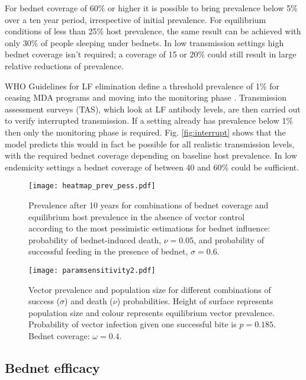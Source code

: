 \documentclass[5p,times]{elsarticle}
\begin{document}
For bednet coverage of 60\% or higher it is possible to bring prevalence below 5\% over a ten year period, irrespective of initial prevalence. For equilibrium conditions of less than 25\% host prevalence, the same result can be achieved with only 30\% of people sleeping under bednets. In low transmission settings high bednet coverage isn't required; a coverage of 15 or 20\% could still result in large relative reductions of prevalence.

WHO Guidelines for LF elimination define a threshold prevalence of 1\% for ceasing MDA programs and moving into the monitoring phase \cite{GPELF}. Transmission assessment surveys (TAS), which look at LF antibody levels, are then carried out to verify interrupted transmission. If a setting already has prevalence below 1\% then only the monitoring phase is required. Fig. \ref{fig:interrupt} shows that the model predicts this would in fact be possible for all realistic transmission levels, with the required bednet coverage depending on baseline host prevalence. In low endemicity settings a bednet coverage of between 40 and 60\% could be sufficient.
\begin{figure}[h]
\begin{center}
\texttt{[image: heatmap\_prev\_pess.pdf]}
\caption{Prevalence after 10 years for combinations of bednet coverage and equilibrium host prevalence in the absence of vector control according to the most pessimistic estimations for bednet influence: probability of bednet-induced death, $\nu=0.05$, and probability of successful feeding in the presence of bednet, $\sigma=0.6$.}
\label{fig:inter_pess}
\end{center}
\end{figure}
\begin{figure}[h]
\begin{center}
\texttt{[image: paramsensitivity2.pdf]}
\caption{Vector prevalence and population size for different combinations of success ($\sigma$) and death ($\nu$) probabilities. Height of surface represents population size and colour represents equilibrium vector prevalence. Probability of vector infection given one successful bite is $p=0.185$. Bednet coverage: $\omega=0.4$.}
\label{fig:params}
\end{center}
\end{figure}

\subsection{Bednet efficacy}
\end{document}
